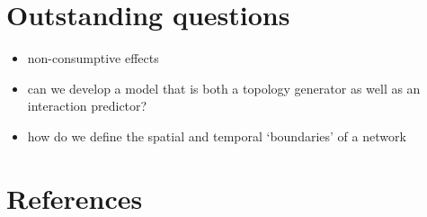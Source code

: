 \documentclass[
]{article}
\begin{document}
\section*{Outstanding questions}\label{outstanding-questions}

\begin{itemize}
\item
  non-consumptive effects
\item
  can we develop a model that is both a topology generator as well as an
  interaction predictor?
\item
  how do we define the spatial and temporal `boundaries' of a network
\end{itemize}

\section*{References}\label{references}
\end{document}
